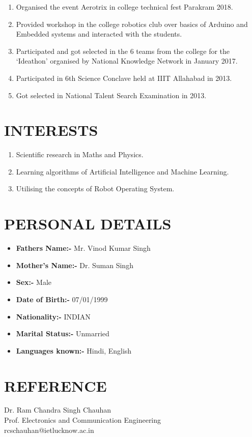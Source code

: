 \documentclass[margin,line]{res}
\begin{document}
\begin{resume}
\begin{enumerate}
\item Organised the event Aerotrix in college technical fest Parakram 2018.
\item Provided workshop in the college robotics club over basics of Arduino and Embedded systems and interacted with the students.
\item Participated and got selected in the 6 teams from the college for the ‘Ideathon’ organised by National Knowledge Network in January 2017.
\item Participated in 6th Science Conclave held at IIIT Allahabad in 2013.
\item Got selected in National Talent Search Examination in 2013.
\end{enumerate}\hfill
\section{\sc INTERESTS}
\begin{enumerate}
\item Scientific research in Maths and Physics.
\item Learning algorithms of Artificial Intelligence and Machine Learning.
\item Utilising the concepts of Robot Operating System.
\end{enumerate}
\section{\sc PERSONAL DETAILS}

\begin{itemize}
\item {\bf Fathers Name:-} Mr. Vinod Kumar Singh
\item {\bf Mother’s Name:-} Dr. Suman Singh
\item {\bf Sex:-} Male
\item {\bf Date of Birth:-} 07/01/1999
\item {\bf Nationality:-} INDIAN
\item {\bf Marital Status:-} Unmarried
\item {\bf Languages known:-} Hindi, English
\end{itemize}

\section{\sc REFERENCE} Dr. Ram Chandra Singh Chauhan\\
Prof. Electronics and Communication Engineering\\ rcschauhan@ietlucknow.ac.in

\end{resume}
\end{document}
